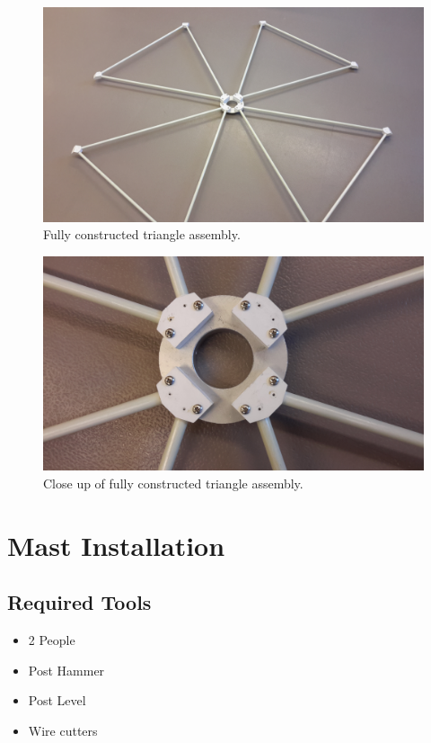 \documentclass[12pt]{article}
\begin{document}
\begin{enumerate}
\begin{figure}[!hp]
   \center
     \includegraphics[width=\linewidth]{20141125_100039.jpg}
        \caption{Fully constructed triangle assembly. \label{TriComplete}}
\end{figure}

\begin{figure}[!tp]
  \center
    \includegraphics[width=\linewidth]{20141125_100047.jpg}
      \caption{Close up of fully constructed triangle assembly. \label{TriZoom}}
\end{figure}

\newpage

\section{Mast Installation} \label{MastInstSec}
	\subsection{Required Tools}
		\begin{itemize}
			\item 2 People
			\item Post Hammer
			\item Post Level
			\item Wire cutters
		\end{itemize}

\end{enumerate}
\end{document}
